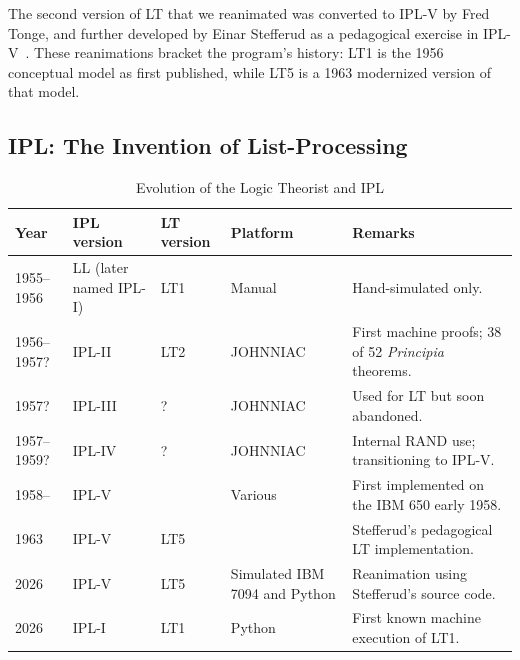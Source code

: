 \documentclass[journal]{IEEEtran}
\begin{document}
The second version of LT that we reanimated was converted to IPL-V by Fred Tonge, and further developed
by Einar Stefferud as a pedagogical exercise in IPL-V~\cite[Section~I]{stefferud1963lt}.
These  reanimations  bracket the program's
history: LT1 is the 1956 conceptual model as first published, while
LT5 is a 1963 modernized version of that model.

\subsection{IPL: The Invention of List-Processing}

\begin{table}[h]
\centering
\caption{Evolution of the Logic Theorist and IPL}
\label{tab:lt_versions}
\begin{tabular}{@{}lllll@{}}
\toprule
\textbf{Year} & \textbf{IPL version} & \textbf{LT version} & \textbf{Platform} & \textbf{Remarks} \\ \midrule
1955--1956 & LL (later named IPL-I) & LT1 & Manual & Hand-simulated only. \\
1956--1957? & IPL-II & LT2 & JOHNNIAC & First machine proofs; 38 of 52 \textit{Principia} theorems. \\
1957? & IPL-III & ? & JOHNNIAC & Used for LT but soon abandoned. \\
1957--1959? & IPL-IV & ? & JOHNNIAC & Internal RAND use; transitioning to IPL-V. \\
1958-- & IPL-V & \ & Various & First implemented on the IBM 650 early 1958. \\
1963 & IPL-V & LT5 & \ & Stefferud's pedagogical LT implementation. \\
2026 & IPL-V & LT5 & Simulated IBM 7094 and Python & Reanimation using Stefferud's source code. \\
2026 & IPL-I & LT1 & Python & First known machine execution of LT1. \\ \bottomrule
\end{tabular}
\end{table}
\end{document}
